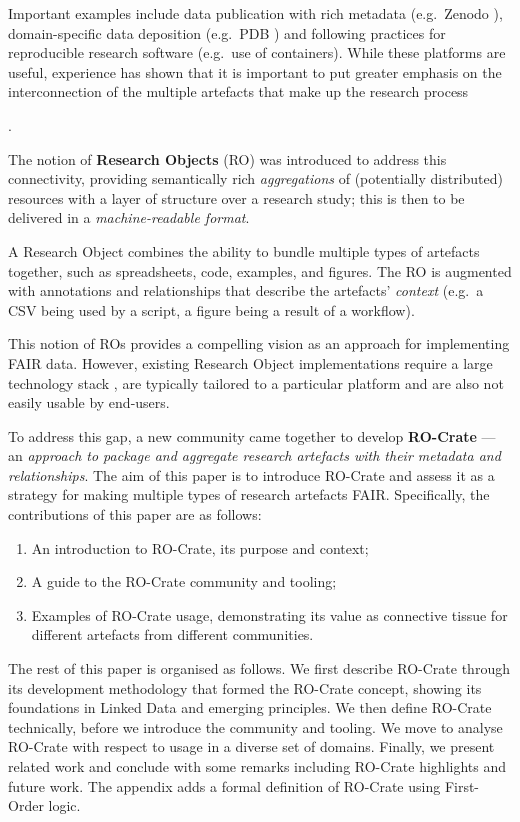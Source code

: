 Important examples include data publication with rich metadata
(e.g.~Zenodo \cite{Dillen 2019}),
domain-specific data deposition (e.g.~PDB
\cite{Berman 2007}) and following
practices for reproducible research software
\cite{ch5-101} (e.g.~use
of containers). While these platforms are useful, experience has shown
that it is important to put greater emphasis on the interconnection of
the multiple artefacts that make up the research process
{\cite{ch5-71}.

The notion of \textbf{Research Objects}
\cite{ch5-12}
(RO) was introduced to address this connectivity, providing semantically
rich \emph{aggregations} of (potentially distributed) resources with a
layer of structure over a research study; this is then to be delivered
in a \emph{machine-readable format}.

A Research Object combines the ability to bundle multiple types of
artefacts together, such as spreadsheets, code, examples, and figures.
The RO is augmented with annotations and relationships that describe the
artefacts' \emph{context} (e.g.~a CSV being used by a script, a figure
being a result of a workflow).

This notion of ROs provides a compelling vision as an approach for
implementing FAIR data. However, existing Research Object
implementations require a large technology stack
\cite{Belhajjame 2015}, are
typically tailored to a particular platform and are also not easily
usable by end-users.

To address this gap, a new community came together
\cite{Ó Carragáin 2019} to develop
\textbf{RO-Crate} --- an \emph{approach to package and aggregate
research artefacts with their metadata and relationships}. The aim of
this paper is to introduce RO-Crate and assess it as a strategy for
making multiple types of research artefacts FAIR. Specifically, the
contributions of this paper are as follows:

\begin{enumerate}
\def\labelenumi{\arabic{enumi}.}
\tightlist
\item
  An introduction to RO-Crate, its purpose and context;
\item
  A guide to the RO-Crate community and tooling;
\item
  Examples of RO-Crate usage, demonstrating its value as connective
  tissue for different artefacts from different communities.
\end{enumerate}

The rest of this paper is organised as follows. We first describe
RO-Crate through its development methodology that formed the RO-Crate
concept, showing its foundations in Linked Data and emerging principles.
We then define RO-Crate technically, before we introduce the community
and tooling. We move to analyse RO-Crate with respect to usage in a
diverse set of domains. Finally, we present related work and conclude
with some remarks including RO-Crate highlights and future work. The
appendix adds a formal definition of RO-Crate using First-Order logic.

}

